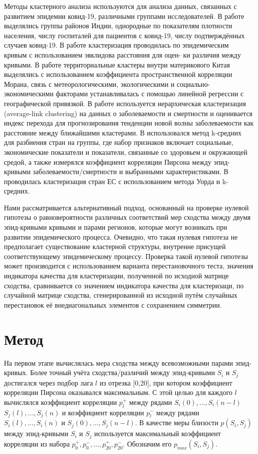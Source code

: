 \documentclass{article}
\begin{document}
Методы кластерного анализа используются для анализа данных, связанных с развитием эпидемии ковид-19, различными группами исследователей. В работе \cite{1} выделялись группы районов Индии, однородные по показателям плотности населения, числу госпиталей для пациентов с ковид-19, числу подтверждённых случаев ковид-19. В работе \cite{2}кластеризация проводилась по эпидемическим кривым с использованием эвклидова расстояния для оцен-
ки различия между кривыми. В работе \cite{3} территориальные кластеры внутри материкового Китая выделялись с использованием коэффициента пространственной корреляции Морана, связь с метеорологическими, экологическими и социально-экономическими факторами устанавливалась с помощью линейной регрессии с географической привязкой. В работе \cite{4} используется иерархическая кластеризация (average-link clustering) на данных о заболеваемости и смертности и оценивается индекс перехода для прогнозирования тенденции новой волны заболеваемости как расстояние между ближайшими кластерами. В \cite{5} использовался метод k-средних для разбиения стран на группы, где набор признаков включает социальные, экономические показатели и показатели, связанные со здоровьем и окружающей средой, а также измерялся коэффициент корреляции Пирсона между эпид-кривыми заболеваемости/смертности и выбранными характеристиками. В \cite{6} проводилась кластеризация стран ЕС с использованием метода Уорда и k-средних.


Нами рассматривается альтернативный подход, основанный на проверке нулевой гипотезы о равновероятности различных соответствий мер сходства между двумя эпид-кривыми кривыми и парами регионов, которые могут возникать при развитии эпидемического процесса. Очевидно, что такая нулевая гипотеза не предполагает существование кластерной структуры, внутренне присущей соответствующему эпидемическому процессу. Проверка такой нулевой гипотезы может производится с использованием варианта перестановочного теста, значения индикатора качества для кластеризации, полученной по исходной матрице сходства, сравнивается со значением индикатора качества для кластеризаци, по случайной матрице сходства, сгенерированной из исходной путём случайных перестановок её внедиагональных
элементов с сохранением симметрии.



\section{Метод}
На первом этапе вычислялась мера сходства между всевозможными парами эпид-кривых. Более точный учёта сходства/различий между
эпид-кривыми $S_i$ и $S_j$ достигался через подбор лага $l$ из отрезка [0,20], при котором коэффициент корреляции Пирсона оказывался максимальным. С этой целью для каждого $l$ вычислялся коэффициент корреляции $p^+_l$
между рядами $S_i (0), . . . , S_i (n - l)$  $S_j (l), . . . , S_j (n)$ и коэффициент корреляции $p^{-}_{l}$ между рядами $S_i (l), . . . , S_i (n)$ и $S_j (0), . . . , S_j (n - l)$. В качестве меры близости $p(S_i, S_j)$ между эпид-кривыми $S_i$ и $S_j$ используется максимальный коэффициент корреляции из набора $p^+_0, p^-_0, ..., p^+_{20}, p^-_{20}$. Обозначим его $p_{max}(S_i, S_j)$.
\end{document}
